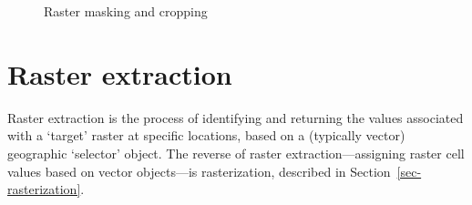 \documentclass[
  letterpaper,
]{krantz}
\begin{document}
\begin{figure}

\begin{minipage}{0.50\linewidth}



\end{minipage}%
%
\begin{minipage}{0.50\linewidth}



\end{minipage}%
\newline
\begin{minipage}{0.50\linewidth}



\end{minipage}%
%
\begin{minipage}{0.50\linewidth}



\end{minipage}%

\caption{\label{fig-raster-crop}Raster masking and cropping}

\end{figure}%

\section{Raster extraction}\label{sec-raster-extraction}

Raster extraction is the process of identifying and returning the values
associated with a `target' raster at specific locations, based on a
(typically vector) geographic `selector' object. The reverse of raster
extraction---assigning raster cell values based on vector objects---is
rasterization, described in Section~\ref{sec-rasterization}.
\end{document}
